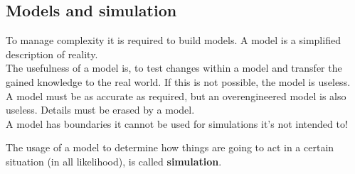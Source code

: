 \hypertarget{models-and-simulation}{%
\subsection{Models and simulation}\label{models-and-simulation}}

To manage complexity it is required to build models. A model is a
simplified description of reality.\\
The usefulness of a model is, to test changes within a model and
transfer the gained knowledge to the real world. If this is not
possible, the model is useless.\\
A model must be as accurate as required, but an overengineered model is
also useless. Details must be erased by a model.\\
A model has boundaries it cannot be used for simulations it's not
intended to!

The usage of a model to determine how things are going to act in a
certain situation (in all likelihood), is called \textbf{simulation}.
